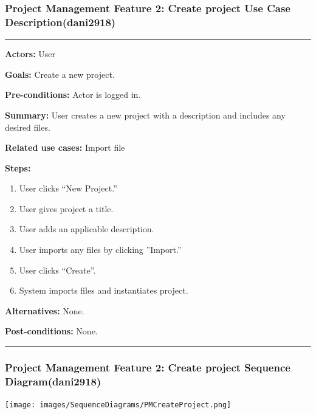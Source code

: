 \documentclass[twoside,letterpaper]{article}
\begin{document}
\newpage


\newpage

\subsubsection[Project Management Feature 2: Create project Use Case Description (dani2918)]{\rmfamily\bfseries\color{black}
	Project Management Feature 2: Create project Use Case Description(dani2918)}
\hypertarget{RefHeading22059017292}{}
\bigskip

\vspace{2pt}
\hrule
\vspace{8pt}
 \noindent \textbf{Actors:} User \newline
 
 \noindent \textbf{Goals:} Create a new project. \newline
 
 \noindent  \textbf{Pre-conditions:} Actor is logged in.  \newline
 
 \noindent \textbf{Summary:} User creates a new project with a description and includes any desired files. \newline
 
 \noindent \textbf{Related use cases:} Import file \newline
 
 \noindent \textbf{Steps:} \begin{enumerate}
  \item User clicks ``New Project.''
  \item User gives project a title.
  \item User adds an applicable description.
  \item User imports any files by clicking ''Import.''
  \item User clicks ``Create''.
  \item System imports files and instantiates project.
 \end{enumerate}
 \textbf{Alternatives:} None. \newline
 
 \noindent  \textbf{Post-conditions:} None. \newline

\vspace{8pt}
\hrule

\vspace{20pt}

\subsubsection[Project Management Feature 2: Create project Sequence Diagram (dani2918)]{\rmfamily\bfseries\color{black}
	Project Management Feature 2: Create project Sequence Diagram(dani2918)}
\texttt{[image: images/SequenceDiagrams/PMCreateProject.png]}
\end{document}
